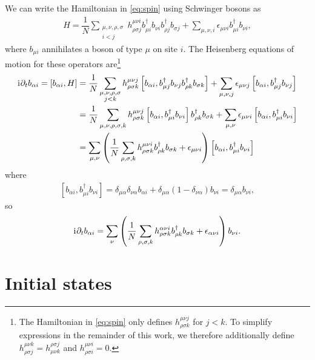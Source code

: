 \documentclass[nofootinbib,notitlepage,11pt]{revtex4-2}
\newcommand{\f}[2]{\dfrac{#1}{#2}} %
\newcommand{\p}[1]{\left(#1\right)} %
\renewcommand{\sp}[1]{\left[#1\right]} %
\renewcommand{\d}{\partial} %
\renewcommand{\i}{\mathrm{i}\mkern1mu} %
\newcommand{\1}{\mathds{1}}
\begin{document}
We can write the Hamiltonian in \eqref{eq:spin} using Schwinger bosons
as
\begin{align}
  H = \f1N \sum_{\substack{\mu,\nu,\rho,\sigma\\i<j}}
  h^{\mu\nu i}_{\rho\sigma j}
  b_{\mu i}^\dag b_{\nu i} b_{\rho j}^\dag b_{\sigma j}
  + \sum_{\mu,\nu,i} \epsilon_{\mu\nu i} b_{\mu i}^\dag b_{\nu i},
\end{align}
where $b_{\mu i}$ annihilates a boson of type $\mu$ on site $i$.  The
Heisenberg equations of motion for these operators are\footnote{The
  Hamiltonian in \eqref{eq:spin} only defines
  $h^{\mu\nu j}_{\rho\sigma k}$ for $j<k$.  To simplify expressions in
  the remainder of this work, we therefore additionally define
  $h^{\mu\nu k}_{\rho\sigma j}=h^{\rho\sigma j}_{\mu\nu k}$ and
  $h^{\mu\nu i}_{\rho\sigma i}=0$.}
\begin{align}
  \i \d_t b_{\alpha i} = \sp{b_{\alpha i}, H}
  &= \f1N \sum_{\substack{\mu,\nu,\rho,\sigma\\j<k}}
  h^{\mu\nu j}_{\rho\sigma k}
  \sp{b_{\alpha i}, b_{\mu j}^\dag b_{\nu j} b_{\rho k}^\dag b_{\sigma k}}
  + \sum_{\mu,\nu,j} \epsilon_{\mu\nu j}
  \sp{b_{\alpha i}, b_{\mu j}^\dag b_{\nu j}} \\
  &= \f1N \sum_{\mu,\nu,\rho,\sigma,k}
  h^{\mu\nu j}_{\rho\sigma k}
  \sp{b_{\alpha i}, b_{\mu i}^\dag b_{\nu i}} b_{\rho k}^\dag b_{\sigma k}
  + \sum_{\mu,\nu} \epsilon_{\mu\nu i}
  \sp{b_{\alpha i}, b_{\mu i}^\dag b_{\nu i}} \\
  &= \sum_{\mu,\nu} \p{\f1N \sum_{\rho,\sigma,k}
    h^{\mu\nu i}_{\rho\sigma k} b_{\rho k}^\dag b_{\sigma k}
    + \epsilon_{\mu\nu i}}
  \sp{b_{\alpha i}, b_{\mu i}^\dag b_{\nu i}}
\end{align}
where
\begin{align}
  \sp{b_{\alpha i}, b_{\mu i}^\dag b_{\nu i}}
  = \delta_{\mu\alpha} \delta_{\nu\alpha} b_{\alpha i}
  + \delta_{\mu\alpha} \p{1-\delta_{\nu\alpha}} b_{\nu i}
  = \delta_{\mu\alpha} b_{\nu i},
\end{align}
so
\begin{align}
  \i \d_t b_{\alpha i}
  = \sum_\nu \p{\f1N \sum_{\rho,\sigma,k}
    h^{\alpha\nu i}_{\rho\sigma k} b_{\rho k}^\dag b_{\sigma k}
    + \epsilon_{\alpha\nu i}} b_{\nu i}.
\end{align}

\section{Initial states}
\end{document}
